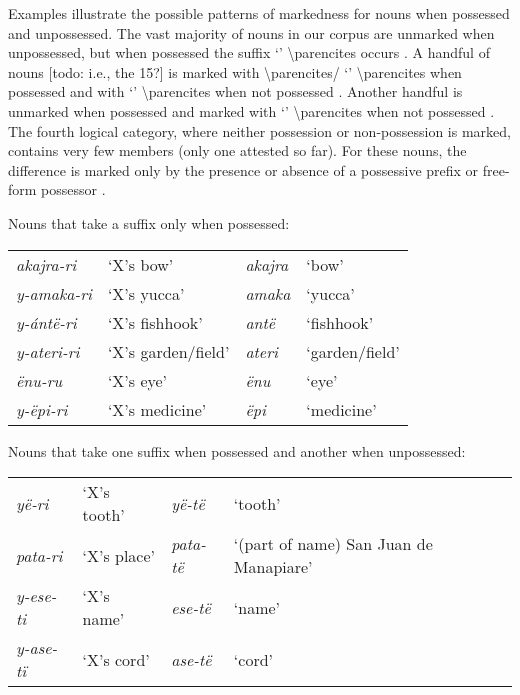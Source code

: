 \documentclass{memoir}
\begin{document}
Examples  illustrate the
possible patterns of markedness for nouns when possessed and
unpossessed. The vast majority of nouns in our corpus are unmarked when
unpossessed, but when possessed the suffix  `'
\textbackslash parencites occurs . A handful of
nouns {[}todo: i.e., the 15?{]} is marked with 
\textbackslash parencites/ `'
\textbackslash parencites when possessed and with  `'
\textbackslash parencites when not possessed .
Another handful is unmarked when possessed and marked with 
`' \textbackslash parencites when not possessed
. The fourth logical category, where neither
possession or non-possession is marked, contains very few members (only
one attested so far). For these nouns, the difference is marked only by
the presence or absence of a possessive prefix or free-form possessor
.

\ex\label{onlypossessed} Nouns that take a suffix only when possessed:

\begin{tabular}[t]{llll}

 \emph{akajra-ri} &          ‘X’s bow’ & \emph{akajra} &          ‘bow’ \\

\emph{y-amaka-ri} &        ‘X’s yucca’ &  \emph{amaka} &        ‘yucca’ \\
 \emph{y-ántë-ri} &     ‘X’s fishhook’ &   \emph{antë} &     ‘fishhook’ \\
\emph{y-ateri-ri} & ‘X’s garden/field’ &  \emph{ateri} & ‘garden/field’ \\
    \emph{ënu-ru} &          ‘X’s eye’ &    \emph{ënu} &          ‘eye’ \\
  \emph{y-ëpi-ri} &     ‘X’s medicine’ &    \emph{ëpi} &     ‘medicine’ \\

\end{tabular}
 \xe

\ex\label{diffpossessed} Nouns that take one suffix when possessed and
another when unpossessed:

\begin{tabular}[t]{llll}

   \emph{yë-ri} & ‘X’s tooth’ &   \emph{yë-të} &                                ‘tooth’ \\

 \emph{pata-ri} & ‘X’s place’ & \emph{pata-të} & ‘(part of name) San Juan de Manapiare’ \\
\emph{y-ese-ti} & ‘X’s name’  &  \emph{ese-të} &                                 ‘name’ \\
\emph{y-ase-tï} & ‘X’s cord’  &  \emph{ase-të} &                                 ‘cord’ \\

\end{tabular}
 \xe
\end{document}
